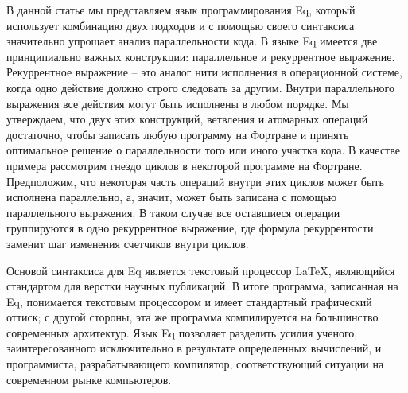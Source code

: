 \documentclass[a4paper]{llncs}
\begin{document}
В данной статье мы представляем язык программирования Eq, который
использует комбинацию двух подходов и с помощью своего синтаксиса
значительно упрощает анализ параллельности кода.  В языке Eq имеется
две принципиально важных конструкции: параллельное и рекуррентное
выражение.  Рекуррентное выражение -- это аналог нити исполнения в
операционной системе, когда одно действие должно строго следовать за
другим.  Внутри параллельного выражения все действия могут быть
исполнены в любом порядке.  Мы утверждаем, что двух этих конструкций,
ветвления и атомарных операций достаточно, чтобы записать любую
программу на Фортране и принять оптимальное решение о параллельности
того или иного участка кода.  В качестве примера рассмотрим гнездо
циклов в некоторой программе на Фортране.  Предположим, что некоторая
часть операций внутри этих циклов может быть исполнена параллельно, а,
значит, может быть записана с помощью параллельного выражения.  В
таком случае все оставшиеся операции группируются в одно рекуррентное
выражение, где формула рекуррентости заменит шаг изменения счетчиков
внутри циклов.  

Основой синтаксиса для Eq является текстовый процессор \LaTeX,
являющийся стандартом для верстки научных публикаций.  В итоге
программа, записанная на Eq, понимается текстовым процессором и имеет
стандартный графический оттиск; с другой стороны, эта же программа
компилируется на большинство современных архитектур.  Язык Eq
позволяет разделить усилия ученого, заинтересованного исключительно в
результате определенных вычислений, и программиста, разрабатывающего
компилятор, соответствующий ситуации на современном рынке компьютеров.
\end{document}
